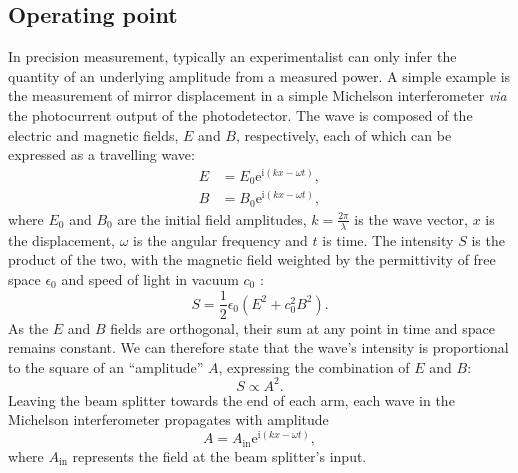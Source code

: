 \subsection{\label{sec:operating-point}Operating point}
In precision measurement, typically an experimentalist can only infer the quantity of an underlying amplitude from a measured power. A simple example is the measurement of mirror displacement in a simple Michelson interferometer \emph{via} the photocurrent output of the photodetector. The wave is composed of the electric and magnetic fields, $E$ and $B$, respectively, each of which can be expressed as a travelling wave:
\begin{align}
  E &= E_0 \text{e}^{\text{i} \left( kx - \omega t \right)}, \\
  B &= B_0 \text{e}^{\text{i}  \left( kx - \omega t \right)},
\end{align}
where $E_0$ and $B_0$ are the initial field amplitudes, $k = \frac{2 \pi}{\lambda}$ is the wave vector, $x$ is the displacement, $\omega$ is the angular frequency and $t$ is time. The intensity $S$ is the product of the two, with the magnetic field weighted by the permittivity of free space $\epsilon_0$ and speed of light in vacuum $c_0$ :
\begin{equation}
  S = \frac{1}{2} \epsilon_0 \left( E^2 + c_0^2 B^2 \right).
\end{equation}
As the $E$ and $B$ fields are orthogonal, their sum at any point in time and space remains constant. We can therefore state that the wave's intensity is proportional to the square of an ``amplitude'' $A$, expressing the combination of $E$ and $B$:
\begin{equation}
  S \propto A^2.
\end{equation}
Leaving the beam splitter towards the end of each arm, each wave in the Michelson interferometer propagates with amplitude
\begin{equation}
  A = A_{\text{in}} \text{e}^{\text{i} \left( kx - \omega t \right)},
\end{equation}
where $A_{\text{in}}$ represents the field at the beam splitter's input.

